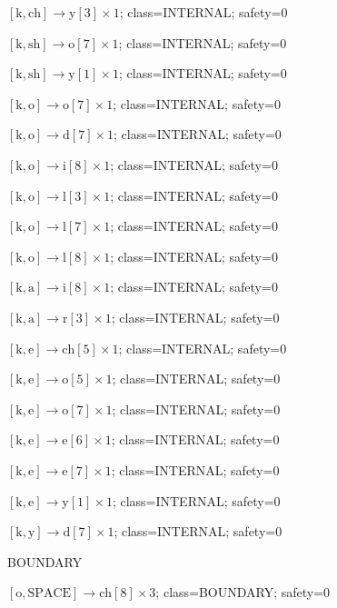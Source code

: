 \(\left[\mathrm{k}, \mathrm{ch}\right] \to \mathrm{y}[3] \times 1\); class=INTERNAL; safety=0\par
\(\left[\mathrm{k}, \mathrm{sh}\right] \to \mathrm{o}[7] \times 1\); class=INTERNAL; safety=0\par
\(\left[\mathrm{k}, \mathrm{sh}\right] \to \mathrm{y}[1] \times 1\); class=INTERNAL; safety=0\par
\(\left[\mathrm{k}, \mathrm{o}\right] \to \mathrm{o}[7] \times 1\); class=INTERNAL; safety=0\par
\(\left[\mathrm{k}, \mathrm{o}\right] \to \mathrm{d}[7] \times 1\); class=INTERNAL; safety=0\par
\(\left[\mathrm{k}, \mathrm{o}\right] \to \mathrm{i}[8] \times 1\); class=INTERNAL; safety=0\par
\(\left[\mathrm{k}, \mathrm{o}\right] \to \mathrm{l}[3] \times 1\); class=INTERNAL; safety=0\par
\(\left[\mathrm{k}, \mathrm{o}\right] \to \mathrm{l}[7] \times 1\); class=INTERNAL; safety=0\par
\(\left[\mathrm{k}, \mathrm{o}\right] \to \mathrm{l}[8] \times 1\); class=INTERNAL; safety=0\par
\(\left[\mathrm{k}, \mathrm{a}\right] \to \mathrm{i}[8] \times 1\); class=INTERNAL; safety=0\par
\(\left[\mathrm{k}, \mathrm{a}\right] \to \mathrm{r}[3] \times 1\); class=INTERNAL; safety=0\par
\(\left[\mathrm{k}, \mathrm{e}\right] \to \mathrm{ch}[5] \times 1\); class=INTERNAL; safety=0\par
\(\left[\mathrm{k}, \mathrm{e}\right] \to \mathrm{o}[5] \times 1\); class=INTERNAL; safety=0\par
\(\left[\mathrm{k}, \mathrm{e}\right] \to \mathrm{o}[7] \times 1\); class=INTERNAL; safety=0\par
\(\left[\mathrm{k}, \mathrm{e}\right] \to \mathrm{e}[6] \times 1\); class=INTERNAL; safety=0\par
\(\left[\mathrm{k}, \mathrm{e}\right] \to \mathrm{e}[7] \times 1\); class=INTERNAL; safety=0\par
\(\left[\mathrm{k}, \mathrm{e}\right] \to \mathrm{y}[1] \times 1\); class=INTERNAL; safety=0\par
\(\left[\mathrm{k}, \mathrm{y}\right] \to \mathrm{d}[7] \times 1\); class=INTERNAL; safety=0\par
BOUNDARY\par
\(\left[\mathrm{o}, \mathrm{SPACE}\right] \to \mathrm{ch}[8] \times 3\); class=BOUNDARY; safety=0\par
